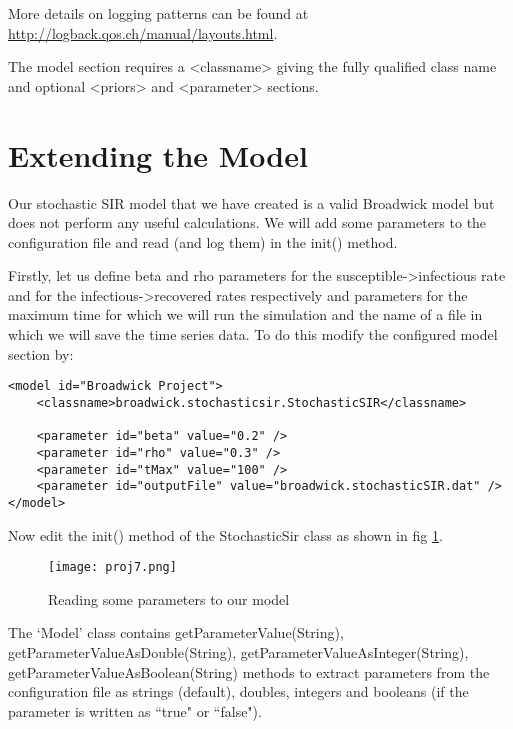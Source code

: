 More details on logging patterns can be found at \url{http://logback.qos.ch/manual/layouts.html}.

The model section requires a <classname> giving the fully qualified class name and optional <priors> and <parameter> sections. 

\section{Extending the Model}

Our stochastic SIR model that we have created is a valid Broadwick model but does not perform any useful calculations. We will add some parameters to the configuration file and read (and log them) in the init() method.

Firstly, let us define beta and rho parameters for the susceptible->infectious rate and for the infectious->recovered rates respectively and parameters for the maximum time for which we will run the simulation and the name of a file in which we will save the time series data. To do this modify the configured model section by:

\begin{sourcecode}
\begin{verbatim}
<model id="Broadwick Project">
    <classname>broadwick.stochasticsir.StochasticSIR</classname>

    <parameter id="beta" value="0.2" />
    <parameter id="rho" value="0.3" />
    <parameter id="tMax" value="100" />
    <parameter id="outputFile" value="broadwick.stochasticSIR.dat" />
</model> 
\end{verbatim}
\end{sourcecode}

Now edit the init() method of the StochasticSir class as shown in fig \ref{proj7}.

\begin{figure}[h!]
\centering\texttt{[image: proj7.png]}
\caption{Reading some parameters to our model}
\label{proj7}
\end{figure}

The `Model' class contains getParameterValue(String), getParameterValueAsDouble(String), getParameterValueAsInteger(String), getParameterValueAsBoolean(String) methods to extract parameters from the configuration file as strings (default), doubles, integers and booleans (if the parameter is written as ``true" or ``false").

